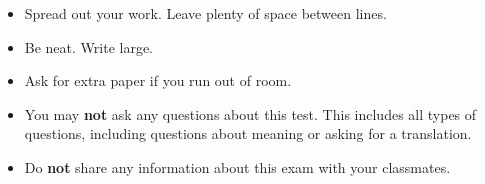 \documentclass{ximera}
\begin{document}
\begin{itemize}
\item Spread out your work. Leave plenty of space between lines.

\item Be neat. Write large.

\item Ask for extra paper if you run out of room.

\item You may {\bf not} ask any questions about this test. This includes all types of questions, including questions about meaning or asking for a translation.

\item Do {\bf not} share any information about this exam with your classmates.

\end{itemize}
\end{document}
